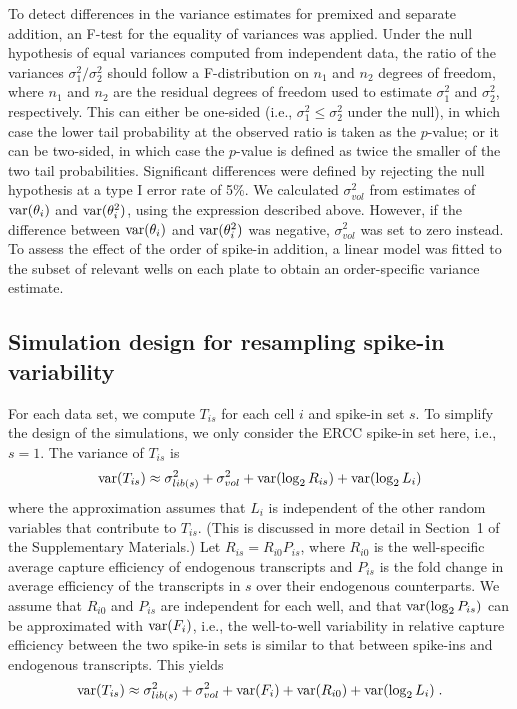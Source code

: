 \documentclass{article}
\newcommand{\suppsecmath}{1}
\begin{document}
To detect differences in the variance estimates for premixed and separate addition, an F-test for the equality of variances was applied.
Under the null hypothesis of equal variances computed from independent data, the ratio of the variances $\sigma^2_1/\sigma^2_2$ should follow a F-distribution on $n_1$ and $n_2$ degrees of freedom, where $n_1$ and $n_2$ are the residual degrees of freedom used to estimate $\sigma^2_1$ and $\sigma^2_2$, respectively.
This can either be one-sided (i.e., $\sigma^2_1 \le \sigma^2_2$ under the null), in which case the lower tail probability at the observed ratio is taken as the $p$-value;
or it can be two-sided, in which case the $p$-value is defined as twice the smaller of the two tail probabilities.
Significant differences were defined by rejecting the null hypothesis at a type I error rate of 5\%.
We calculated $\sigma^2_{vol}$ from estimates of $\mbox{var}(\theta_i)$ and $\mbox{var}(\theta^2_i)$, using the expression described above.
However, if the difference between $\mbox{var}(\theta_i)$ and $\mbox{var}(\theta^2_i)$ was negative, $\sigma^2_{vol}$ was set to zero instead.
To assess the effect of the order of spike-in addition, a linear model was fitted to the subset of relevant wells on each plate to obtain an order-specific variance estimate.

\subsection{Simulation design for resampling spike-in variability}
For each data set, we compute $T_{is}$ for each cell $i$ and spike-in set $s$.
To simplify the design of the simulations, we only consider the ERCC spike-in set here, i.e., $s=1$.
The variance of $T_{is}$ is
\[
    \mbox{var}(T_{is}) \approx \sigma^2_{lib(s)} + \sigma^2_{vol} + \mbox{var}(\log_2 R_{is}) + \mbox{var}(\log_2 L_i)
\]
where the approximation assumes that $L_i$ is independent of the other random variables that contribute to $T_{is}$.
(This is discussed in more detail in Section~\suppsecmath{} of the Supplementary Materials.)
Let $R_{is} = R_{i0}P_{is}$, where $R_{i0}$ is the well-specific average capture efficiency of endogenous transcripts and $P_{is}$ is the fold change in average efficiency of the transcripts in $s$ over their endogenous counterparts.
We assume that $R_{i0}$ and $P_{is}$ are independent for each well, and that $\mbox{var}(\log_2 P_{is})$ can be approximated with $\mbox{var}(F_i)$,
i.e., the well-to-well variability in relative capture efficiency between the two spike-in sets is similar to that between spike-ins and endogenous transcripts.
This yields
\[
    \mbox{var}(T_{is}) \approx \sigma^2_{lib(s)} + \sigma^2_{vol} + \mbox{var}(F_i) + \mbox{var}(R_{i0}) + \mbox{var}(\log_2 L_i) \;.
\]
\end{document}
